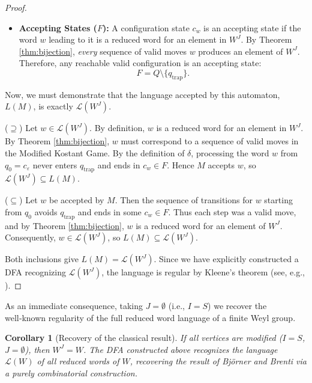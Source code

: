 \documentclass[11pt,a4paper]{amsart}
\theoremstyle{plain}
\newtheorem{corollary}[theorem]{Corollary}
\theoremstyle{definition}
\theoremstyle{remark}
\begin{document}
\begin{proof}
\begin{itemize}
		\item \textbf{Accepting States ($F$):} A configuration state $c_w$ is an accepting state if the word $w$ leading to it is a reduced word for an element in $W^J$. By Theorem \ref{thm:bijection}, \emph{every} sequence of valid moves $w$ produces an element of $W^J$. Therefore, any reachable valid configuration is an accepting state:
		$$F = Q \setminus \{q_{\text{trap}}\}.$$
	\end{itemize}
	
	Now, we must demonstrate that the language accepted by this automaton, $L(M)$, is exactly $\mathcal{L}(W^J)$.
	
	($\supseteq$) Let $w \in \mathcal{L}(W^J)$. By definition, $w$ is a reduced word for an element in $W^J$. By Theorem \ref{thm:bijection}, $w$ must correspond to a sequence of valid moves in the Modified Kostant Game. By the definition of $\delta$, processing the word $w$ from $q_0 = c_{\varepsilon}$ never enters $q_{\text{trap}}$ and ends in $c_w \in F$. Hence $M$ accepts $w$, so $\mathcal{L}(W^J) \subseteq L(M)$.
	
	($\subseteq$) Let $w$ be accepted by $M$. Then the sequence of transitions for $w$ starting from $q_0$ avoids $q_{\text{trap}}$ and ends in some $c_w \in F$. Thus each step was a valid move, and by Theorem \ref{thm:bijection}, $w$ is a reduced word for an element of $W^J$. Consequently, $w \in \mathcal{L}(W^J)$, so $L(M) \subseteq \mathcal{L}(W^J)$.
	
	Both inclusions give $L(M) = \mathcal{L}(W^J)$. Since we have explicitly constructed a DFA recognizing $\mathcal{L}(W^J)$, the language is regular by Kleene's theorem (see, e.g., \cite{HopcroftUllman1979}).
\end{proof}

As an immediate consequence, taking $J = \emptyset$ (i.e., $I = S$) we recover the well‑known regularity of the full reduced word language of a finite Weyl group.

\begin{corollary}[Recovery of the classical result]
	If all vertices are modified ($I=S$, $J=\emptyset$), then $W^J = W$. The DFA constructed above recognizes the language $\mathcal{L}(W)$ of all reduced words of $W$, recovering the result of Björner and Brenti \cite[\S 4.8]{BjornerBrenti2005} via a purely combinatorial construction.
\end{corollary}
\end{document}
